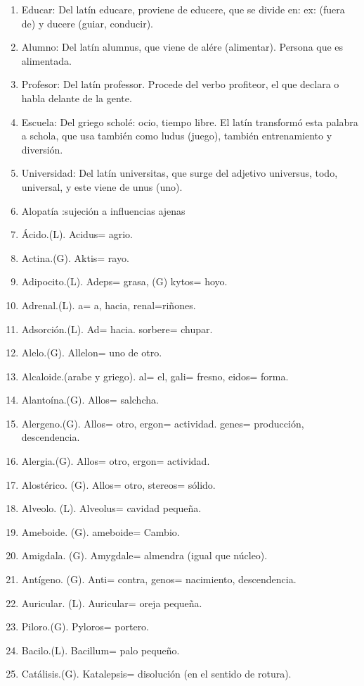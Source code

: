 \documentclass{mylib/reporte}
\begin{document}
\begin{enumerate}
	\item Educar: Del latín educare, proviene de educere, que se divide en: ex: (fuera  de) y ducere (guiar, conducir).
	\item Alumno: Del latín alumnus, que viene de alére (alimentar). Persona que es alimentada.
	\item Profesor: Del latín professor. Procede del verbo profiteor, el que declara o habla delante de la gente.
	\item Escuela: Del griego scholé: ocio, tiempo libre.  El latín transformó esta palabra a schola, que usa también como ludus (juego), también entrenamiento y diversión.
	\item Universidad: Del latín universitas, que surge del adjetivo universus, todo, universal, y este viene de unus (uno).
	\item Alopatía :sujeción a influencias ajenas
	\item Ácido.(L). Acidus= agrio.
	\item Actina.(G). Aktis= rayo.
	\item Adipocito.(L). Adeps= grasa, (G) kytos= hoyo.
	\item Adrenal.(L). a= a, hacia, renal=riñones.
	\item Adsorción.(L). Ad= hacia. sorbere= chupar.
	\item Alelo.(G). Allelon= uno de otro.
	\item Alcaloide.(arabe y griego). al= el, gali= fresno, eidos= forma.
	\item Alantoína.(G). Allos= salchcha.
	\item Alergeno.(G). Allos= otro, ergon= actividad. genes= producción, descendencia.
	\item Alergia.(G). Allos= otro, ergon= actividad.
	\item Alostérico. (G). Allos= otro, stereos= sólido.
	\item Alveolo. (L). Alveolus= cavidad pequeña.
	\item Ameboide. (G). ameboide= Cambio.
	\item Amigdala. (G). Amygdale= almendra (igual que núcleo).
	\item Antígeno. (G). Anti= contra, genos= nacimiento, descendencia.
	\item Auricular. (L). Auricular= oreja pequeña.
	\item Piloro.(G). Pyloros= portero.
	\item Bacilo.(L). Bacillum= palo pequeño.
	\item Catálisis.(G). Katalepsis= disolución (en el sentido de rotura).

\end{enumerate}
\end{document}
